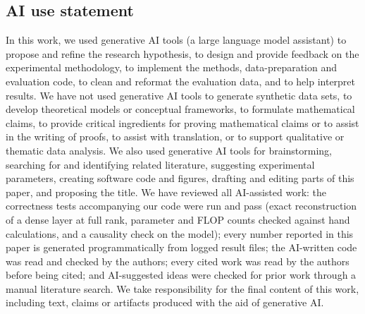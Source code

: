\documentclass{article}
\begin{document}
\subsection*{AI use statement}
In this work, we used generative AI tools (a large language model assistant) to propose and refine the
research hypothesis, to design and provide feedback on the experimental methodology, to implement the
methods, data-preparation and evaluation code, to clean and reformat the evaluation data, and to help
interpret results. We have not used generative AI tools to generate synthetic data sets, to develop
theoretical models or conceptual frameworks, to formulate mathematical claims, to provide critical
ingredients for proving mathematical claims or to assist in the writing of proofs, to assist with
translation, or to support qualitative or thematic data analysis.
We also used generative AI tools for brainstorming, searching for and identifying related literature,
suggesting experimental parameters, creating software code and figures, drafting and editing parts of
this paper, and proposing the title.
We have reviewed all AI-assisted work: the correctness tests accompanying our code were run and pass
(exact reconstruction of a dense layer at full rank, parameter and FLOP counts checked against hand
calculations, and a causality check on the model); every number reported in this paper is generated
programmatically from logged result files; the AI-written code was read and
checked by the authors; every cited work was read by the authors before being cited; and AI-suggested
ideas were checked for prior work through a manual literature search. We take responsibility for the
final content of this work, including text, claims or artifacts produced with the aid of generative AI.
\end{document}
